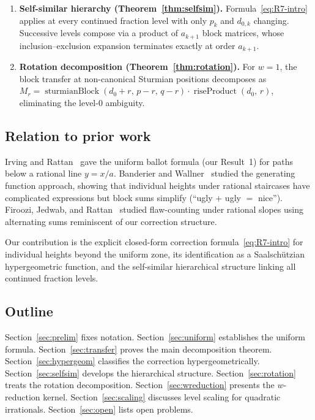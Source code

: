 \documentclass[11pt]{article}
\theoremstyle{definition}
\theoremstyle{remark}
\begin{document}
\begin{enumerate}
\item \textbf{Self-similar hierarchy (Theorem~\ref{thm:selfsim}).}
  Formula~\eqref{eq:R7-intro} applies at every continued fraction
  level with only $p_k$ and $d_{0,k}$ changing.
  Successive levels compose via a product of $a_{k+1}$ block
  matrices, whose inclusion--exclusion expansion terminates exactly
  at order $a_{k+1}$.

\item \textbf{Rotation decomposition (Theorem~\ref{thm:rotation}).}
  For $w = 1$, the block transfer at non-canonical Sturmian
  positions decomposes as
  $M_r = \operatorname{sturmianBlock}(d_0{+}r,\, p{-}r,\, q{-}r)
  \cdot \operatorname{riseProduct}(d_0,\, r)$,
  eliminating the level-$0$ ambiguity.
\end{enumerate}

\subsection{Relation to prior work}

Irving and Rattan~\cite{IrvingRattan2009} gave the uniform ballot
formula (our Result~1) for paths below a rational line $y = x/a$.
Banderier and Wallner~\cite{BanderierWallner2019} studied the
generating function approach, showing that individual heights under
rational staircases have complicated expressions but block sums
simplify (``ugly $+$ ugly $=$ nice'').
Firoozi, Jedwab, and Rattan~\cite{FirooziJedwabRattan2026} studied
flaw-counting under rational slopes using alternating sums
reminiscent of our correction structure.

Our contribution is the explicit closed-form correction
formula~\eqref{eq:R7-intro} for individual heights beyond the
uniform zone, its identification as a Saalsch\"utzian hypergeometric
function, and the self-similar hierarchical structure linking all
continued fraction levels.

\subsection{Outline}

Section~\ref{sec:prelim} fixes notation.
Section~\ref{sec:uniform} establishes the uniform formula.
Section~\ref{sec:transfer} proves the main decomposition theorem.
Section~\ref{sec:hypergeom} classifies the correction
hypergeometrically.
Section~\ref{sec:selfsim} develops the hierarchical structure.
Section~\ref{sec:rotation} treats the rotation decomposition.
Section~\ref{sec:wreduction} presents the $w$-reduction kernel.
Section~\ref{sec:scaling} discusses level scaling for quadratic
irrationals.
Section~\ref{sec:open} lists open problems.
\end{document}
